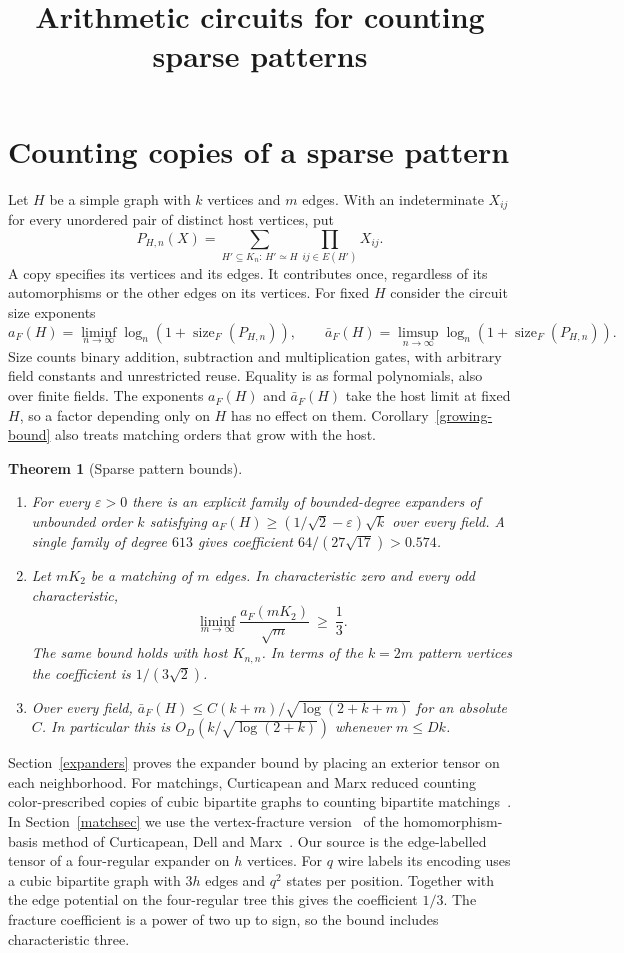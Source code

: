 \documentclass[11pt]{article}
\title{Arithmetic circuits for counting sparse patterns}
\author{}
\newtheorem{theorem}{Theorem}
\theoremstyle{remark}
\newcommand{\sizeF}{\operatorname{size}_F}
\begin{document}
\maketitle

\section{Counting copies of a sparse pattern}
Let $H$ be a simple graph with $k$ vertices and $m$ edges. With an indeterminate $X_{ij}$ for every unordered pair of distinct host vertices, put
\[
 P_{H,n}(X)=\sum_{H'\subseteq K_n:\,H'\simeq H}\prod_{ij\in E(H')}X_{ij}.
\]
A copy specifies its vertices and its edges. It contributes once, regardless of its automorphisms or the other edges on its vertices. For fixed $H$ consider the circuit size exponents
\[
 a_F(H)=\liminf_{n\to\infty}\log_n(1+\sizeF(P_{H,n})),\qquad
 \bar a_F(H)=\limsup_{n\to\infty}\log_n(1+\sizeF(P_{H,n})).
\]
Size counts binary addition, subtraction and multiplication gates, with arbitrary field constants and unrestricted reuse. Equality is as formal polynomials, also over finite fields. The exponents $a_F(H)$ and $\bar a_F(H)$ take the host limit at fixed $H$, so a factor depending only on $H$ has no effect on them. Corollary~\ref{growing-bound} also treats matching orders that grow with the host.

\begin{theorem}[Sparse pattern bounds]\label{main}
\leavevmode
\begin{enumerate}
\item\label{main:expanders} For every $\varepsilon>0$ there is an explicit family of bounded-degree expanders of unbounded order $k$ satisfying $a_F(H)\ge (1/\sqrt2-\varepsilon)\sqrt k$ over every field. A single family of degree $613$ gives coefficient $64/(27\sqrt{17})>0.574$.
\item\label{main:matchings} Let $mK_2$ be a matching of $m$ edges. In characteristic zero and every odd characteristic,
\[
 \liminf_{m\to\infty}\frac{a_F(mK_2)}{\sqrt m}\ \ge\ \frac13 .
\]
The same bound holds with host $K_{n,n}$. In terms of the $k=2m$ pattern vertices the coefficient is $1/(3\sqrt2)$.
\item\label{main:upper} Over every field, $\bar a_F(H)\le C(k+m)/\sqrt{\log(2+k+m)}$ for an absolute $C$. In particular this is $O_D(k/\sqrt{\log(2+k)})$ whenever $m\le Dk$.
\end{enumerate}
\end{theorem}
Section~\ref{expanders} proves the expander bound by placing an exterior tensor on each neighborhood. For matchings, Curticapean and Marx reduced counting color-prescribed copies of cubic bipartite graphs to counting bipartite matchings~\cite[Section~4]{cm}. In Section~\ref{matchsec} we use the vertex-fracture version~\cite{fractures} of the homomorphism-basis method of Curticapean, Dell and Marx~\cite{cdm}. Our source is the edge-labelled tensor of a four-regular expander on $h$ vertices. For $q$ wire labels its encoding uses a cubic bipartite graph with $3h$ edges and $q^2$ states per position. Together with the edge potential on the four-regular tree this gives the coefficient $1/3$. The fracture coefficient is a power of two up to sign, so the bound includes characteristic three.
\end{document}
